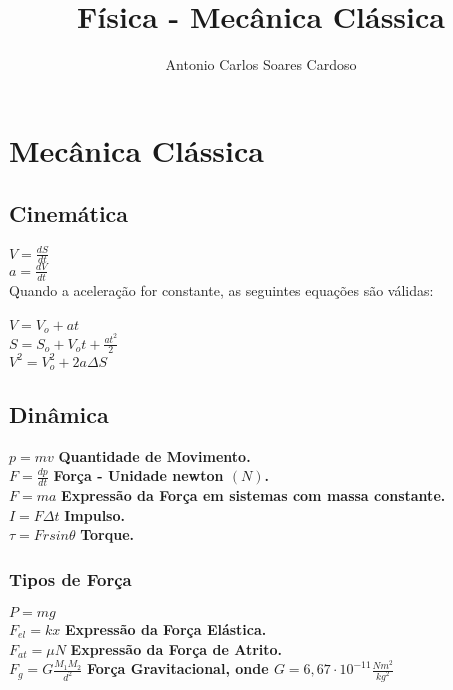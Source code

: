 \documentclass[
    12pt, %
    openright,
    twoside, %
    a4paper, %
    article,
    english,brazil %
]{abntex2}
\author{Antonio Carlos Soares Cardoso}
\title{Física - Mecânica Clássica}
\makeatletter
\renewcommand\tableofcontents{%
  \null\hfill\textbf{\Large\contentsname}\hfill\null\par
  \@mkboth{\MakeUppercase\contentsname}{\MakeUppercase\contentsname}%
  \@starttoc{toc}%
}
\makeatother
\begin{document}
\tableofcontents

\newpage

\textual

\noindent

\chapter{Mecânica Clássica} 

\section{Cinemática}

$V = \frac{dS}{dt}$ \\
$a = \frac{dV}{dt}$ \\

\noindent
Quando a aceleração for constante, as seguintes equações são válidas:
\\
\\
\noindent
$V = V_o + at$ \\
$S = S_o + V_ot + \frac{at^2}{2}$ \\
$V^2 = V_o^2 + 2a\Delta S$ \\

\section{Dinâmica}

$p = mv$ \quad \textbf{Quantidade de Movimento.} \\
$F = \frac{dp}{dt}$ \quad \textbf{Força - Unidade newton $(N)$.} \\
$F = ma$ \quad \textbf{Expressão da Força em sistemas com massa constante.} \\
$I = F\Delta t$ \quad \textbf{Impulso.} \\
$\tau = Frsin\theta$ \quad \textbf{Torque.} \\

\subsection{Tipos de Força} 

$P = mg$ \\
$F_{el} = kx$ \quad \textbf{Expressão da Força Elástica.} \\
$F_{at} = \mu N$ \quad \textbf{Expressão da Força de Atrito.} \\
$F_{g} = G\frac{M_1M_2}{d^2}$ \textbf{Força Gravitacional, onde $G = 6,67 \cdot 10^{-11} \frac{Nm^2}{kg^2}$}
\end{document}
